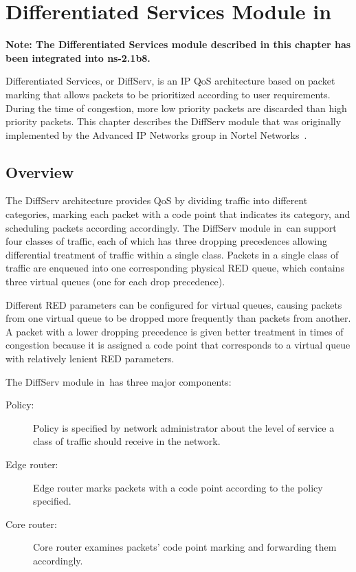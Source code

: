 %
% 
%
\chapter{Differentiated Services Module in \ns}
\label{chap:diffserv}

\textbf{Note: The Differentiated Services module described in this chapter has been integrated into ns-2.1b8.}

Differentiated Services, or DiffServ, is an IP QoS architecture based on 
  packet marking that allows packets to be prioritized according to user 
  requirements.  
During the time of congestion, 
  more low priority packets are discarded than high priority packets.
This chapter describes the DiffServ module that was originally 
  implemented by the Advanced IP Networks group in 
  Nortel Networks~\cite{Diffserv}.

\section{Overview}
\label{sec:diffservoverview}

The DiffServ architecture provides QoS by 
  dividing traffic into different categories, 
  marking each packet with a code point that indicates its category, 
  and scheduling packets according accordingly. 
The DiffServ module in~\ns can support four classes of traffic, 
  each of which has three dropping precedences allowing
  differential treatment of traffic within a single class. 
Packets in a single class of traffic are enqueued into 
  one corresponding physical RED queue, 
  which contains three virtual queues (one for each drop precedence).

Different RED parameters can be configured for virtual queues, 
  causing packets from one virtual queue to be dropped 
  more frequently than packets from another.  
A packet with a lower dropping precedence is given 
  better treatment in times of congestion 
  because it is assigned a code point that corresponds to a virtual 
  queue with relatively lenient RED parameters.  

The DiffServ module in~\ns has three major components:

\begin{description}
\item [Policy:]
Policy is specified by network administrator about 
  the level of service a class of traffic should receive in the network.  

\item [Edge router:]
Edge router marks packets with a code point according to the policy specified.

\item [Core router:]
Core router examines packets' code point marking and forwarding them accordingly.

\end{description}

